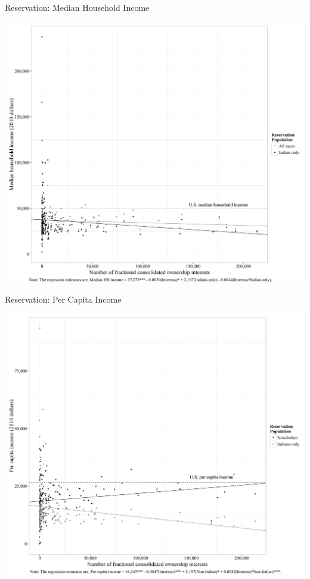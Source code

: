 \documentclass[ignorenonframetext,]{beamer}
\begin{document}
\begin{frame}{Reservation: Median Household Income}

\centering
\includegraphics{frac_med_hh_inc.jpeg}

\end{frame}

\begin{frame}{Reservation: Per Capita Income}

\centering
\includegraphics{frac_pcinc.jpeg}

\end{frame}
\end{document}
